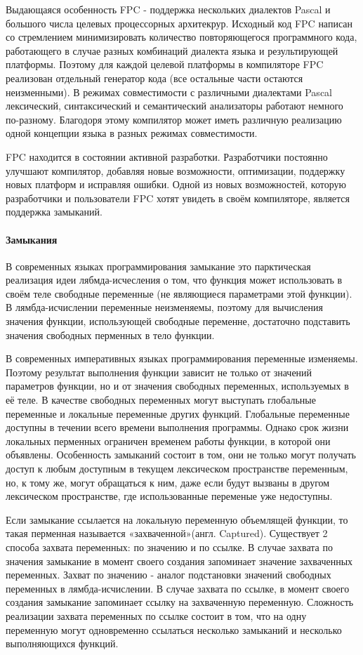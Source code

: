 \documentclass{imcs}
\begin{document}
Выдающаяся особенность FPC - поддержка нескольких диалектов Pascal 
и большого числа целевых процессорных архитекрур. Исходный код FPC написан со
стремлением минимизировать количество повторяющегося программного кода,
работающего в случае разных комбинаций
диалекта языка и результирующей платформы. Поэтому для каждой целевой платформы
в компиляторе FPC реализован отдельный генератор кода (все остальные части остаются
неизменными). В режимах совместимости с различными диалектами Pascal лексический,
синтаксический и семантический анализаторы работают немного по-разному. Благодоря этому
компилятор может иметь различную реализацию одной концепции языка в разных режимах
совместимости.

FPC находится в состоянии активной разработки. Разработчики постоянно улучшают компилятор,
добавляя новые возможности, оптимизации, поддержку новых платформ и исправляя ошибки\cite{fpc}. Одной из новых возможностей, которую разработчики и пользователи FPC хотят увидеть в
своём компиляторе, является поддержка замыканий.

\paragraph{Замыкания} В современных языках программирования замыкание это парктическая реализация
идеи лябмда-исчесления о том, что функция может использовать в своём теле свободные
переменные (не являющиеся параметрами этой функции). В лямбда-исчислении
переменные неизменяемы, поэтому для вычисления значения функции, использующей
свободные переменне, достаточно подставить значения свободных перменных в тело
функции.

В современных императивных языках программирования переменные изменяемы.
Поэтому результат выполнения функции зависит не только от значений параметров
функции, но и от значения свободных переменных, используемых в её теле. В качестве
свободных переменных могут выступать глобальные переменные и локальные переменные
других функций. Глобальные переменные доступны в течении всего времени выполнения программы.
Однако срок жизни
локальных перменных ограничен временем работы функции, в которой они объявлены.
Особенность замыканий состоит в том, они не только могут получать доступ к любым
доступным в текущем лексическом пространстве переменным, но, к тому же, могут
обращаться к ним, даже если будут вызваны в другом лексическом пространстве, где
использованные переменые уже недоступны.

Если замыкание ссылается на локальную переменную объемлящей функции, то такая перменная 
называется «захваченной»(англ. Captured)\cite{anonymmethods}\cite{cpp}. Существует 2
способа захвата переменных: по значению и по ссылке. В случае захвата по значения
замыкание в момент своего создания запоминает значение захваченных переменных.
Захват по значению - аналог подстановки значений свободных переменных в лямбда-исчислении.
В случае захвата по ссылке, в момент своего создания замыкание запоминает ссылку 
на захваченную переменную. Сложность реализации захвата переменных по ссылке состоит в том,
что на одну переменную могут одновременно ссылаться несколько замыканий и несколько
выполняющихся функций.
\end{document}
